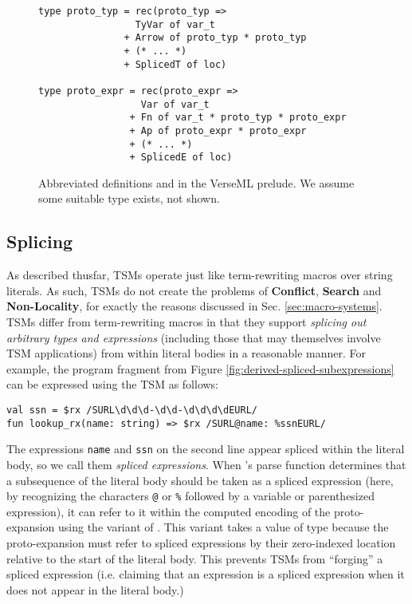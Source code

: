 \begin{figure}
\begin{lstlisting}[numbers=none]
type proto_typ = rec(proto_typ => 
                 TyVar of var_t 
               + Arrow of proto_typ * proto_typ 
               + (* ... *) 
               + SplicedT of loc)

type proto_expr = rec(proto_expr => 
                  Var of var_t 
                + Fn of var_t * proto_typ * proto_expr
                + Ap of proto_expr * proto_expr
                + (* ... *) 
                + SplicedE of loc)
\end{lstlisting}
\caption[Abbreviated definitions of  and  in VerseML]{Abbreviated definitions  and  in the VerseML prelude. We assume some suitable type  exists, not shown.}
\label{fig:candidate-exp-verseml}
\vspace{-5px}
\end{figure}


\subsection{Splicing}\label{sec:splicing-and-hygiene}
As described thusfar, TSMs operate just like term-rewriting macros over string literals. As such, TSMs do not create the problems of \textbf{Conflict}, \textbf{Search} and \textbf{Non-Locality}, for exactly the reasons discussed in Sec. \ref{sec:macro-systems}. TSMs differ from term-rewriting macros in that they support \emph{splicing out arbitrary types and expressions} (including those that may themselves involve TSM applications) from within literal bodies in a reasonable manner. For example, the program fragment from Figure \ref{fig:derived-spliced-subexpressions} can be expressed using the  TSM as follows:
\begin{lstlisting}[numbers=none]
val ssn = $rx /SURL\d\d\d-\d\d-\d\d\d\dEURL/ 
fun lookup_rx(name: string) => $rx /SURL@name: %ssnEURL/ 
\end{lstlisting}
The expressions \lstinline{name} and \lstinline{ssn} on the second line appear spliced within the literal body, so we call them \emph{spliced expressions}. When 's parse function determines that a subsequence of the literal body should be taken as a spliced expression (here, by recognizing the characters \lstinline{@} or \lstinline{%} followed by a variable or parenthesized expression), 
it can refer to it within the computed encoding of the proto-expansion using the  variant of . This variant takes a value of type  because the proto-expansion must refer to spliced expressions by their zero-indexed location relative to the start of the literal body. This prevents TSMs from ``forging'' a spliced expression (i.e. claiming that an expression is a spliced expression when it does not appear in the literal body.) 

